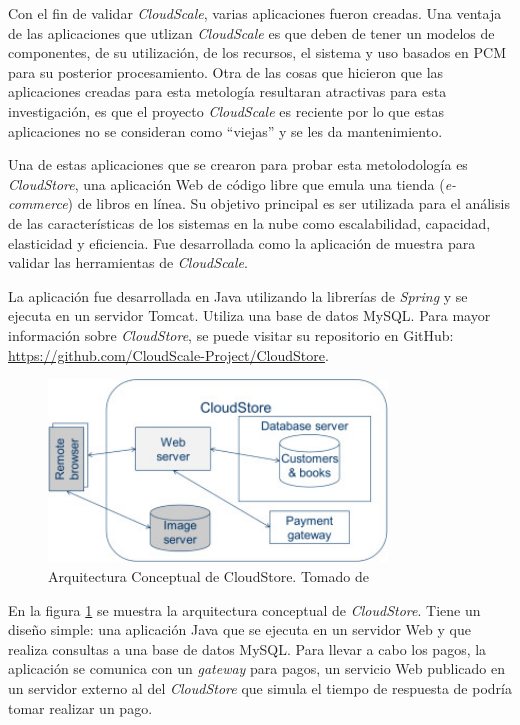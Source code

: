 \documentclass[conference]{IEEEtran}
\begin{document}
Con el fin de validar \emph{CloudScale}, varias aplicaciones fueron creadas. Una ventaja de las aplicaciones que utlizan \emph{CloudScale} es que deben de tener un modelos de componentes, de su utilización, de los recursos, el sistema y uso basados en PCM para su posterior procesamiento. Otra de las cosas que hicieron que las aplicaciones creadas para esta metología resultaran atractivas para esta investigación, es que el proyecto \emph{CloudScale} es reciente por lo que estas aplicaciones no se consideran como ``viejas'' y se les da mantenimiento.

Una de estas aplicaciones que se crearon para probar esta metolodología es \emph{CloudStore}, una aplicación Web de código libre que emula una tienda (\emph{e-commerce}) de libros en línea. Su objetivo principal es ser utilizada para el análisis de las características de los sistemas en la nube como escalabilidad, capacidad, elasticidad y eficiencia. Fue desarrollada como la aplicación de muestra para validar las herramientas de \emph{CloudScale}. 

La aplicación fue desarrollada en Java utilizando la librerías de \emph{Spring} y se ejecuta en un servidor Tomcat. Utiliza una base de datos MySQL. Para mayor información sobre \emph{CloudStore}, se puede visitar su repositorio en GitHub: \url{https://github.com/CloudScale-Project/CloudStore}.

\begin{figure}[h]
  \centering
  \includegraphics[width=9cm]{conceptual-cloudstore-architecture}
  \caption{\small{Arquitectura Conceptual de CloudStore. Tomado de \cite{cloudscale-2}}}
  \label{fig:cloudstore-conceptual}
\end{figure}

En la figura \ref{fig:cloudstore-conceptual} se muestra la arquitectura conceptual de \emph{CloudStore}. Tiene un diseño simple: una aplicación Java que se ejecuta en un servidor Web y que realiza consultas a una base de datos MySQL. Para llevar a cabo los pagos, la aplicación se comunica con un \emph{gateway} para pagos, un servicio Web publicado en un servidor externo al del \emph{CloudStore} que simula el tiempo de respuesta de podría tomar realizar un pago.
\end{document}
